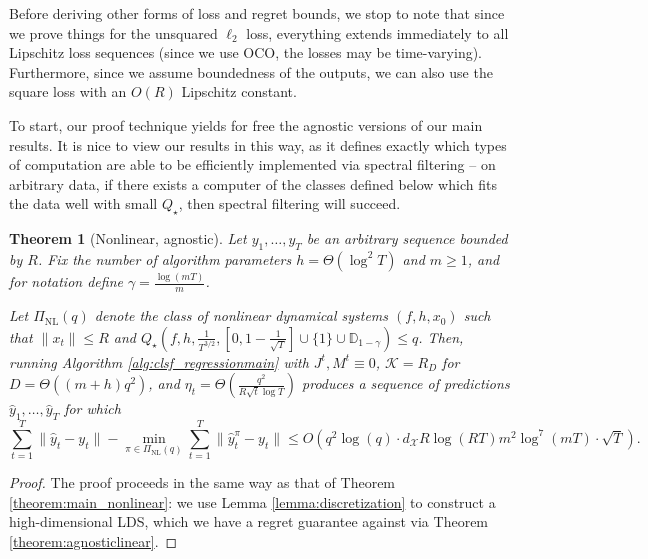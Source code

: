 \documentclass[11pt]{article}
\newcommand{\evannote}[1]{\textcolor{red}{\{evan: #1\}}}
\newtheorem{theorem}{Theorem}[section]
\numberwithin{equation}{section}
\begin{document}
Before deriving other forms of loss and regret bounds, we stop to note that since we prove things for the unsquared $\ell_2$ loss, everything extends immediately to all Lipschitz loss sequences (since we use OCO, the losses may be time-varying). Furthermore, since we assume boundedness of the outputs, we can also use the square loss with an $O(R)$ Lipschitz constant. 

To start, our proof technique yields for free the agnostic versions of our main results. 
It is nice to view our results in this way, as it defines exactly which types of computation are able to be efficiently implemented via spectral filtering -- on arbitrary data, if there exists a computer of the classes defined below which fits the data well with small $Q_\star$, then spectral filtering will succeed.

\begin{theorem}[Nonlinear, agnostic]
    Let $y_1, \ldots, y_T$ be an arbitrary sequence bounded by $R$. Fix the number of algorithm parameters $h = \Theta(\log^2 T)$ and $m \geq 1$, and for notation define $\gamma = \frac{\log(mT)}{m}$.

    Let $\Pi_\text{NL}\left( q\right)$ denote the class of nonlinear dynamical systems $(f, h, x_0)$ such that $\|x_t\| \leq R$ and $Q_\star\left(f, h, \frac{1}{T^{3/2}}, \left[0, 1 - \frac{1}{\sqrt{T}}\right] \cup \{1\} \cup \mathbb{D}_{1-\gamma}\right) \leq q$. Then, running Algorithm \ref{alg:clsf_regressionmain} with $J^t, M^t \equiv 0$, $\mathcal{K} = R_D$ for $D = \Theta((m+h)q^2)$, and  $\eta_t = \Theta\left(\frac{q^2}{R\sqrt{t}\log T}\right)$ produces a sequence of predictions $\hat{y}_1, \ldots, \hat{y}_T$ for which
    $$\sum_{t=1}^T \|\hat{y}_t - y_t\| - \min_{\pi \in \Pi_{\text{NL}}(q)} \sum_{t=1}^T \|\hat{y}_t^\pi - y_t\| \leq O\left(q^2 \log(q) \cdot d_\mathcal{X} R \log(RT) m^2 \log^7(mT)  \cdot \sqrt{T}\right)  . $$
\end{theorem}
\begin{proof}
    The proof proceeds in the same way as that of Theorem \ref{theorem:main_nonlinear}: we use Lemma \ref{lemma:discretization} to construct a high-dimensional LDS, which we have a regret guarantee against via Theorem \ref{theorem:agnosticlinear}.
\end{proof}
\end{document}
